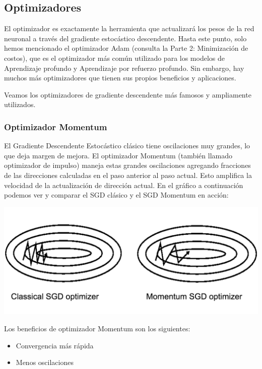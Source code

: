 \documentclass[
]{book}
\providecommand{\tightlist}{%
  \setlength{\itemsep}{0pt}\setlength{\parskip}{0pt}}
\begin{document}
\hypertarget{optimizadores}{%
\subsection{Optimizadores}\label{optimizadores}}

El optimizador es exactamente la herramienta que actualizará los pesos de la red neuronal a través del gradiente estocástico descendente. Hasta este punto, solo hemos mencionado el optimizador Adam (consulta la Parte 2: Minimización de costos), que es el optimizador más común utilizado para los modelos de Aprendizaje profundo y Aprendizaje por refuerzo profundo. Sin embargo, hay muchos más optimizadores que tienen sus propios beneficios y aplicaciones.

Veamos los optimizadores de gradiente descendente más famosos y ampliamente utilizados.

\hypertarget{optimizador-momentum}{%
\subsubsection{Optimizador Momentum}\label{optimizador-momentum}}

El Gradiente Descendente Estocástico clásico tiene oscilaciones muy grandes, lo que deja margen de mejora. El optimizador Momentum (también llamado optimizador de impulso) maneja estas grandes oscilaciones agregando fracciones de las direcciones calculadas en el paso anterior al paso actual. Esto amplifica la velocidad de la actualización de dirección actual. En el gráfico a continuación podemos ver y comparar el SGD clásico y el SGD Momentum en acción:

\includegraphics{Images/ANN_32.png}

Los beneficios de optimizador Momentum son los siguientes:

\begin{itemize}
\tightlist
\item
  Convergencia más rápida
\item
  Menos oscilaciones
\end{itemize}
\end{document}
